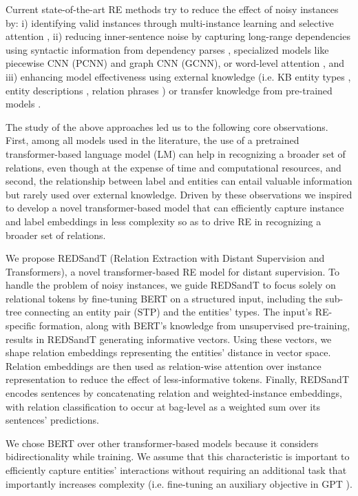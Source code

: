 \documentclass[11pt,a4paper]{article}
\begin{document}
Current state-of-the-art RE methods try to reduce the effect of noisy instances by: i) identifying valid instances through multi-instance learning and selective attention \cite{Lin2016}, ii) reducing inner-sentence noise by capturing long-range dependencies using syntactic information from dependency parses \cite{Mintz2009, He2018, Liu2018}, specialized models like piecewise CNN (PCNN) and graph CNN (GCNN), or word-level attention \cite{He2018}, and iii) enhancing model effectiveness using external knowledge (i.e. KB entity types \cite{Vashishth2018}, entity descriptions \cite{Ji2017, Hu2019}, relation phrases \cite{Vashishth2018}) or transfer knowledge from pre-trained models \cite{Alt2019}.


The study of the above approaches led us to the following core observations. First, among all models used in the literature, the use of a pretrained transformer-based language model (LM) can help in recognizing a broader set of relations, even though at the expense of time and computational resources, and second, the relationship between label and entities can entail valuable information but rarely used over external knowledge. Driven by these observations we inspired to develop a novel transformer-based model that can efficiently capture instance and label embeddings in less complexity so as to drive RE in recognizing a broader set of relations.




We propose REDSandT (Relation Extraction with Distant Supervision and Transformers), a novel transformer-based RE model for distant supervision. To handle the problem of noisy instances, we guide REDSandT to focus solely on relational tokens by fine-tuning BERT on a structured input, including the sub-tree connecting an entity pair (STP) and the entities' types. The input's RE-specific formation, along with BERT's knowledge from unsupervised pre-training, results in REDSandT generating informative vectors. Using these vectors, we shape relation embeddings representing the entities' distance in vector space. Relation embeddings are then used as relation-wise attention over instance representation to reduce the effect of less-informative tokens. Finally, REDSandT encodes sentences by concatenating relation and weighted-instance embeddings, with relation classification to occur at bag-level as a weighted sum over its sentences' predictions. 

We chose BERT over other transformer-based models because it considers bidirectionality while training. We assume that this characteristic is important to efficiently capture entities' interactions without requiring an additional task that importantly increases complexity (i.e. fine-tuning an auxiliary objective in GPT \cite{Alt2019}).
\end{document}

